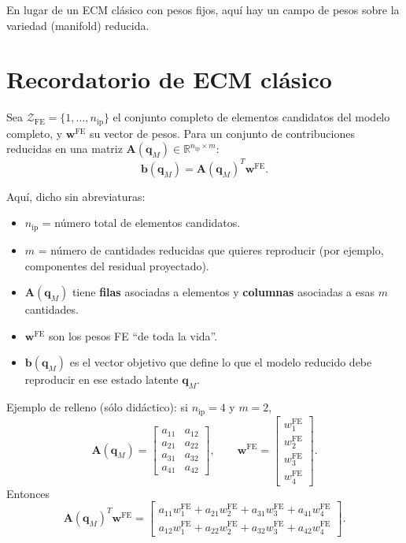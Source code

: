 \documentclass[11pt,a4paper]{article}
\newcommand{\A}{\bm A}
\begin{document}
En lugar de un ECM cl\'asico con pesos fijos, aqu\'i hay un campo de pesos sobre la
variedad (manifold) reducida.

\section{Recordatorio de ECM cl\'asico}
Sea $\mathcal Z_{\text{FE}}=\{1,\dots,n_{\text{ip}}\}$ el conjunto completo de
elementos candidatos del modelo completo, y $\bm w^{\text{FE}}$ su vector de pesos.
Para un conjunto de contribuciones reducidas en una matriz $\A(\bm q_M)\in\mathbb R^{n_{\text{ip}}\times m}$:
\[
\bm b(\bm q_M)=\A(\bm q_M)^T\bm w^{\text{FE}}.
\]

Aqu\'i, dicho sin abreviaturas:
\begin{itemize}[leftmargin=0.8cm]
    \item $n_{\text{ip}}$ = n\'umero total de elementos candidatos.
    \item $m$ = n\'umero de cantidades reducidas que quieres reproducir (por ejemplo, componentes del residual proyectado).
    \item $\A(\bm q_M)$ tiene \textbf{filas} asociadas a elementos y \textbf{columnas} asociadas a esas $m$ cantidades.
    \item $\bm w^{\text{FE}}$ son los pesos FE ``de toda la vida''.
    \item $\bm b(\bm q_M)$ es el vector objetivo que define lo que el modelo reducido debe reproducir en ese estado latente $\bm q_M$.
\end{itemize}

Ejemplo de relleno (s\'olo did\'actico): si $n_{\text{ip}}=4$ y $m=2$,
\[
\A(\bm q_M)=
\begin{bmatrix}
a_{11} & a_{12}\\
a_{21} & a_{22}\\
a_{31} & a_{32}\\
a_{41} & a_{42}
\end{bmatrix},
\qquad
\bm w^{\text{FE}}=
\begin{bmatrix}
w_1^{\text{FE}}\\ w_2^{\text{FE}}\\ w_3^{\text{FE}}\\ w_4^{\text{FE}}
\end{bmatrix}.
\]
Entonces
\[
\A(\bm q_M)^T\bm w^{\text{FE}}=
\begin{bmatrix}
a_{11}w_1^{\text{FE}}+a_{21}w_2^{\text{FE}}+a_{31}w_3^{\text{FE}}+a_{41}w_4^{\text{FE}}\\
a_{12}w_1^{\text{FE}}+a_{22}w_2^{\text{FE}}+a_{32}w_3^{\text{FE}}+a_{42}w_4^{\text{FE}}
\end{bmatrix}.
\]
\end{document}
